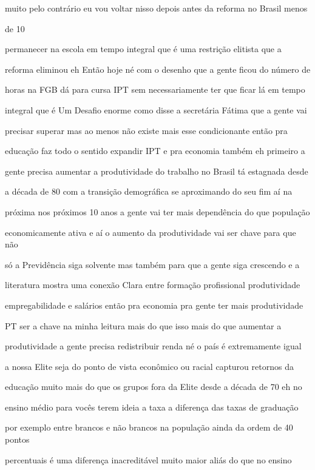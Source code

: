 \documentclass[a4paper,12pt]{article}
\begin{document}
muito pelo contrário eu vou voltar nisso depois antes da reforma no Brasil menos

de 10%

permanecer na escola em tempo integral que é uma restrição elitista que a

reforma eliminou eh Então hoje né com o desenho que a gente ficou do número de

horas na FGB dá para cursa IPT sem necessariamente ter que ficar lá em tempo

integral que é Um Desafio enorme como disse a secretária Fátima que a gente vai

precisar superar mas ao menos não existe mais esse condicionante então pra

educação faz todo o sentido expandir IPT e pra economia também eh primeiro a

gente precisa aumentar a produtividade do trabalho no Brasil tá estagnada desde

a década de 80 com a transição demográfica se aproximando do seu fim aí na

próxima nos próximos 10 anos a gente vai ter mais dependência do que população

economicamente ativa e aí o aumento da produtividade vai ser chave para que não

só a Previdência siga solvente mas também para que a gente siga crescendo e a

literatura mostra uma conexão Clara entre formação profissional produtividade

empregabilidade e salários então pra economia pra gente ter mais produtividade

PT ser a chave na minha leitura mais do que isso mais do que aumentar a

produtividade a gente precisa redistribuir renda né o país é extremamente igual

a nossa Elite seja do ponto de vista econômico ou racial capturou retornos da

educação muito mais do que os grupos fora da Elite desde a década de 70 eh no

ensino médio para vocês terem ideia a taxa a diferença das taxas de graduação

por exemplo entre brancos e não brancos na população ainda da ordem de 40 pontos

percentuais é uma diferença inacreditável muito maior aliás do que no ensino
\end{document}
